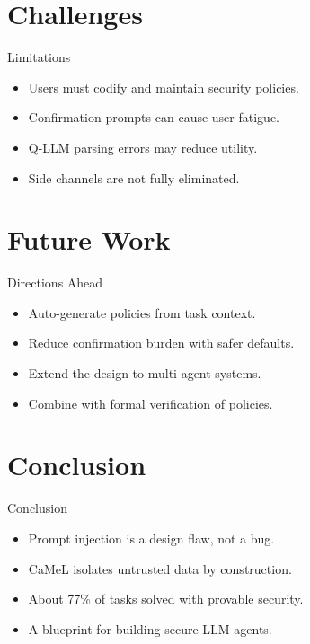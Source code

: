 \documentclass{beamer}
\begin{document}
\section{Challenges}
\begin{frame}{Limitations}
\begin{itemize}
\item Users must codify and maintain security policies.
\item Confirmation prompts can cause user fatigue.
\item Q-LLM parsing errors may reduce utility.
\item Side channels are not fully eliminated.
\end{itemize}
\end{frame}

\section{Future Work}
\begin{frame}{Directions Ahead}
\begin{itemize}
\item Auto-generate policies from task context.
\item Reduce confirmation burden with safer defaults.
\item Extend the design to multi-agent systems.
\item Combine with formal verification of policies.
\end{itemize}
\end{frame}

\section{Conclusion}
\begin{frame}{Conclusion}
\begin{itemize}
\item Prompt injection is a design flaw, not a bug.
\item CaMeL isolates untrusted data by construction.
\item About 77\% of tasks solved with provable security.
\item A blueprint for building secure LLM agents.
\end{itemize}
\end{frame}
\end{document}
